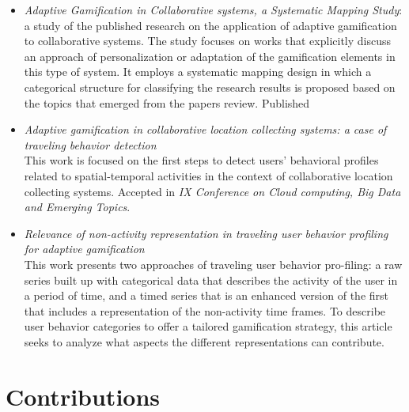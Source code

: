 \documentclass[sigconf]{acmart}
\begin{document}
\begin{itemize}
    \item \textit{Adaptive Gamification in Collaborative systems, a Systematic Mapping Study}:  a study of the published research on the application of adaptive gamification to collaborative systems. The study  focuses  on  works  that  explicitly  discuss  an approach  of personalization or adaptation of the gamification elements in this type of system.  It employs a systematic mapping design in which a categorical structure for classifying the research results is proposed based on the topics that emerged from the papers review.  Published \cite{ayastuy_adaptive_2021}
    \item \textit{Adaptive gamification in collaborative location collecting systems: a case of traveling behavior detection}\\ This work is focused on the first steps to detect users’ behavioral profiles related to spatial-temporal activities in the context of collaborative location collecting systems. Accepted in \textit{IX Conference on Cloud computing, Big Data and Emerging Topics}.
    
    \item \textit{Relevance of non-activity representation in traveling user behavior profiling for adaptive gamification}\\ This work presents two approaches of traveling user behavior pro-filing: a raw series built up with categorical data that describes the activity of the user in a period of time, and a timed series that is an enhanced version of the first that includes a representation of the non-activity time frames. To describe user behavior categories to offer a tailored gamification strategy, this article seeks to analyze what aspects the different representations can contribute. 
\end{itemize}


\section{Contributions}
\end{document}
